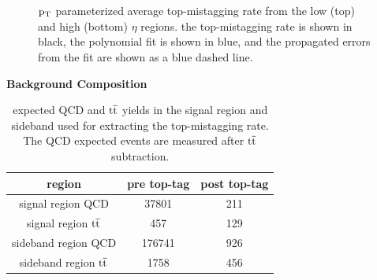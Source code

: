 \begin{figure}[htcb]
\begin{center}
\\
\\
\caption{
$\mathrm{p_{T}}$ parameterized average top-mistagging rate from the low (top) and high (bottom) $\eta$ regions. 
the top-mistagging rate is shown in black, the polynomial fit is shown in blue, and the propagated errors from the fit are shown as a blue dashed line.}
\label{figs:bstagrateetafit}
\end{center}
\end{figure}



\begin{table}
\begin{center}
\bf{Background Composition}\\
\begin{tabular}{c||c|c}
\hline\hline
\bf{region} & \bf{pre top-tag}  & \bf{post top-tag} \\
\hline\hline
signal region QCD & 37801  & 211 \\
signal region $\mathrm{t\overline{t}}$ & 457 & 129 \\
sideband region QCD & 176741 & 926 \\
sideband region $\mathrm{t\overline{t}}$ & 1758 & 456 \\
\hline
\end{tabular}
\end{center}
\caption{expected QCD and $\mathrm{t\overline{t}}$ yields in the signal region and sideband used for extracting the top-mistagging rate.  The QCD expected events are measured after $\mathrm{t\overline{t}}$ subtraction.}
\label{table:bsbkgcomp}
\end{table}


